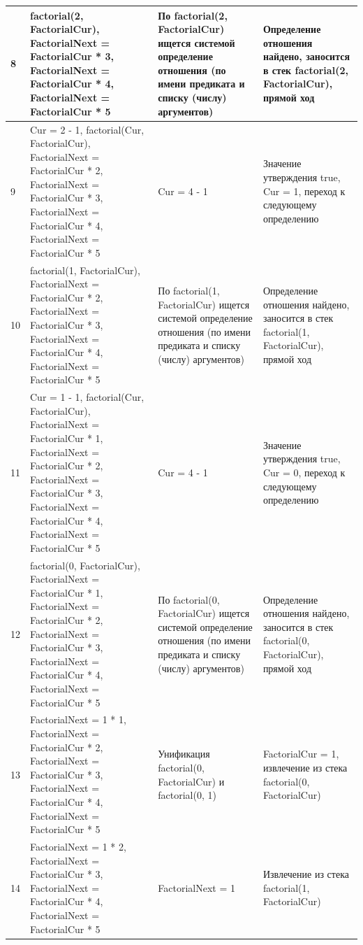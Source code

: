 \documentclass[a4paper,14pt]{extreport} %
\begin{document}
\begin{longtable}{|p{0.5cm}|p{5cm}|p{6cm}|p{5.5cm}|}
	8 & factorial(2, FactorialCur), FactorialNext = FactorialCur * 3, FactorialNext = FactorialCur * 4, FactorialNext = FactorialCur * 5 & По factorial(2, FactorialCur) ищется системой определение отношения (по имени предиката и списку (числу) аргументов) & Определение отношения найдено, заносится в стек factorial(2, FactorialCur), прямой ход \\ \hline
	
	9 & Cur = 2 - 1, factorial(Cur, FactorialCur), FactorialNext = FactorialCur * 2, FactorialNext = FactorialCur * 3, FactorialNext = FactorialCur * 4, FactorialNext = FactorialCur * 5 & Cur = 4 - 1	
	& Значение утверждения true, Cur = 1, переход к следующему определению\\ \hline
	
	10 & factorial(1, FactorialCur), FactorialNext = FactorialCur * 2, FactorialNext = FactorialCur * 3, FactorialNext = FactorialCur * 4, FactorialNext = FactorialCur * 5 & По factorial(1, FactorialCur) ищется системой определение отношения (по имени предиката и списку (числу) аргументов) & Определение отношения найдено, заносится в стек factorial(1, FactorialCur), прямой ход \\ \hline
	
	11 &Cur = 1 - 1, factorial(Cur, FactorialCur), FactorialNext = FactorialCur * 1, FactorialNext = FactorialCur * 2, FactorialNext = FactorialCur * 3, FactorialNext = FactorialCur * 4, FactorialNext = FactorialCur * 5 & Cur = 4 - 1	
	& Значение утверждения true, Cur = 0, переход к следующему определению\\ \hline
	
	12 & factorial(0, FactorialCur), FactorialNext = FactorialCur * 1, FactorialNext = FactorialCur * 2, FactorialNext = FactorialCur * 3, FactorialNext = FactorialCur * 4, FactorialNext = FactorialCur * 5 & По factorial(0, FactorialCur) ищется системой определение отношения (по имени предиката и списку (числу) аргументов) & Определение отношения найдено, заносится в стек factorial(0, FactorialCur), прямой ход \\ \hline
	
	13 & FactorialNext = 1 * 1, FactorialNext = FactorialCur * 2, FactorialNext = FactorialCur * 3, FactorialNext = FactorialCur * 4, FactorialNext = FactorialCur * 5 & Унификация factorial(0, FactorialCur) и factorial(0, 1) & FactorialCur = 1, извлечение из стека factorial(0, FactorialCur) \\ \hline
	
	14 & FactorialNext = 1 * 2, FactorialNext = FactorialCur * 3, FactorialNext = FactorialCur * 4, FactorialNext = FactorialCur * 5 &  FactorialNext = 1& Извлечение из стека factorial(1, FactorialCur) \\ \hline
	

\end{longtable}
\end{document}
